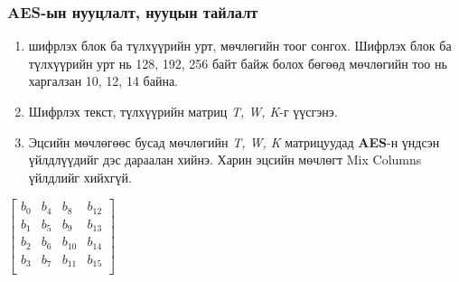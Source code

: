 \subsubsection{AES-ын нууцлалт, нууцын тайлалт}
\begin{enumerate}
	\item шифрлэх блок ба түлхүүрийн урт, мөчлөгийн тоог сонгох. Шифрлэх блок ба түлхүүрийн урт нь 128, 192, 256 байт байж болох бөгөөд мөчлөгийн тоо нь харгалзан 10, 12, 14 байна.
	\item Шифрлэх текст, түлхүүрийн матриц \textit{T, W, K}-г үүсгэнэ.
	\item Эцсийн мөчлөгөөс бусад мөчлөгийн \textit{T, W, K} матрицуудад \textbf{AES}-н үндсэн үйлдлүүдийг дэс дараалан хийнэ. Харин эцсийн мөчлөгт Mix Columns үйлдлийг хийхгүй.
\end{enumerate}
\begin{center}
	$\begin{bmatrix}
		b_{0} & b_{4} & b_{8} & b_{12} \\
		b_{1} & b_{5} & b_{9} & b_{13} \\
		b_{2} & b_{6} & b_{10} & b_{14} \\
		b_{3} & b_{7} & b_{11} & b_{15} \\
		\end{bmatrix}$
\end{center}
